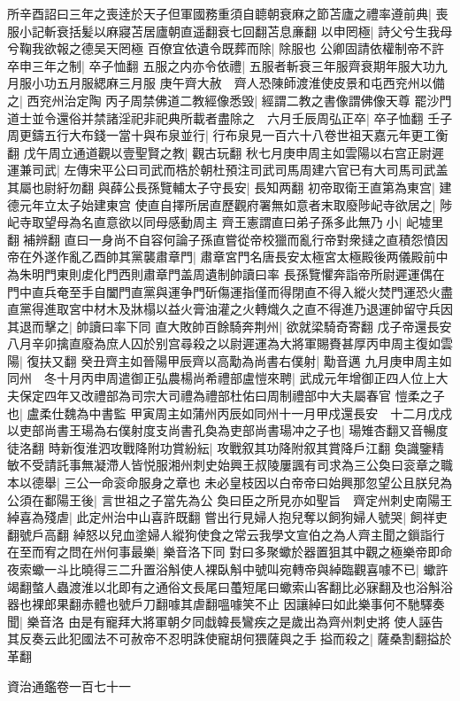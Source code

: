 所辛酉詔曰三年之喪逹於天子但軍國務重須自聼朝衰麻之節苫廬之禮率遵前典|{
	喪服小記斬衰括髪以麻寢苫居廬朝直遥翻衰七回翻苫息亷翻}
以申罔極|{
	詩父兮生我母兮鞠我欲報之德吴天罔極}
百僚宜依遺令既葬而除|{
	除服也}
公卿固請依權制帝不許卒申三年之制|{
	卒子恤翻}
五服之内亦令依禮|{
	五服者斬衰三年服齊衰期年服大功九月服小功五月服緦麻三月服}
庚午齊大赦　齊人恐陳師渡淮使皮景和屯西兖州以備之|{
	西兖州治定陶}
丙子周禁佛道二教經像悉毁|{
	經謂二教之書像謂佛像天尊}
罷沙門道士並令還俗并禁諸淫祀非祀典所載者盡除之　六月壬辰周弘正卒|{
	卒子恤翻}
壬子周更鑄五行大布錢一當十與布泉並行|{
	行布泉見一百六十八卷世祖天嘉元年更工衡翻}
戊午周立通道觀以壹聖賢之教|{
	觀古玩翻}
秋七月庚申周主如雲陽以右宫正尉遲運兼司武|{
	左傳宋平公曰司武而梏於朝杜預注司武司馬周建六官已有大司馬司武盖其屬也尉紆勿翻}
與薛公長孫覽輔太子守長安|{
	長知两翻}
初帝取衛王直第為東宫|{
	建德元年立太子始建東宫}
使直自擇所居直歷觀府署無如意者末取廢陟屺寺欲居之|{
	陟屺寺取望母為名直意欲以同母感動周主}
齊王憲謂直曰弟子孫多此無乃小|{
	屺墟里翻補辨翻}
直曰一身尚不自容何論子孫直嘗從帝校獵而亂行帝對衆撻之直積怨憤因帝在外遂作亂乙酉帥其黨襲肅章門|{
	肅章宮門名唐長安太極宮太極殿後两儀殿前中為朱明門東則䖍化門西則肅章門盖周遺制帥讀曰率}
長孫覽懼奔詣帝所尉遲運偶在門中直兵奄至手自闔門直黨與運争門斫傷運指僅而得閉直不得入縱火焚門運恐火盡直黨得進取宮中材木及牀榻以益火膏油灌之火轉熾久之直不得進乃退運帥留守兵因其退而擊之|{
	帥讀曰率下同}
直大敗帥百餘騎奔荆州|{
	欲就梁騎奇寄翻}
戊子帝還長安八月辛卯擒直廢為庶人囚於别宫尋殺之以尉遲運為大將軍賜賚甚厚丙申周主復如雲陽|{
	復扶又翻}
癸丑齊主如晉陽甲辰齊以高勱為尚書右僕射|{
	勱音邁}
九月庚申周主如同州　冬十月丙申周遣御正弘農楊尚希禮部盧愷來聘|{
	武成元年增御正四人位上大夫保定四年又改禮部為司宗大司禮為禮部杜佑曰周制禮部中大夫屬春官}
愷柔之子也|{
	盧柔仕魏為中書監}
甲寅周主如蒲州丙辰如同州十一月甲戍還長安　十二月戊戍以吏部尚書王瑒為右僕射度支尚書孔奐為吏部尚書瑒冲之子也|{
	瑒雉杏翻又音暢度徒洛翻}
時新復淮泗攻戰降附功賞紛紜|{
	攻戰叙其功降附叙其賞降戶江翻}
奐識鑒精敏不受請託事無凝滯人皆悦服湘州刺史始興王叔陵屢諷有司求為三公奐曰衮章之職本以德舉|{
	三公一命衮命服身之章也}
未必皇枝因以白帝帝曰始興那忽望公且朕兒為公須在鄱陽王後|{
	言世祖之子當先為公}
奐曰臣之所見亦如聖旨　齊定州刺史南陽王綽喜為殘虐|{
	此定州治中山喜許既翻}
嘗出行見婦人抱兒奪以飼狗婦人號哭|{
	飼祥吏翻號戶高翻}
綽怒以兒血塗婦人縱狗使食之常云我學文宣伯之為人齊主聞之鎻詣行在至而宥之問在州何事最樂|{
	樂音洛下同}
對曰多聚蠍於器置狙其中觀之極樂帝即命夜索蠍一斗比曉得三二升置浴斛使人裸臥斛中號叫宛轉帝與綽臨觀喜噱不已|{
	蠍許竭翻螫人蟲渡淮以北即有之通俗文長尾曰蠆短尾曰蠍索山客翻比必寐翻及也浴斛浴器也裸郎果翻赤體也號戶刀翻噱其虐翻嗢噱笑不止}
因讓綽曰如此樂事何不馳驛奏聞|{
	樂音洛}
由是有寵拜大將軍朝夕同戱韓長鸞疾之是歲出為齊州刺史將使人誣告其反奏云此犯國法不可赦帝不忍明誅使寵胡何猥薩與之手搤而殺之|{
	薩桑割翻搤於革翻}


資治通鑑卷一百七十一

